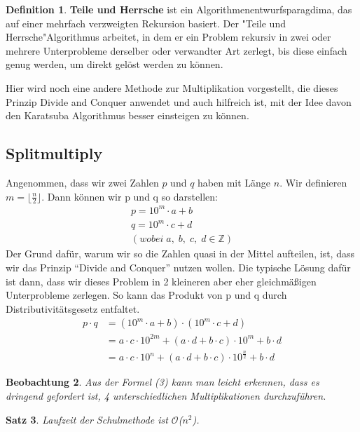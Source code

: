 \documentclass[11pt,a4paper, twoside]{article}
\newtheorem{theorem}{Satz}
\newtheorem{observation}[theorem]{Beobachtung}
\theoremstyle{definition}
\newtheorem{definition}[theorem]{Definition}
\begin{document}
\begin{definition}
\textbf{Teile und Herrsche} ist ein Algorithmenentwurfsparagdima, das auf einer mehrfach verzweigten Rekursion basiert. Der "Teile und Herrsche"\-Algorithmus arbeitet, in dem er ein Problem rekursiv in zwei oder mehrere Unterprobleme derselber oder verwandter Art zerlegt, bis diese einfach genug werden, um direkt gelöst werden zu können. 
\end{definition}

Hier wird noch eine andere Methode zur Multiplikation vorgestellt, die dieses Prinzip Divide and Conquer anwendet und auch hilfreich ist, mit der Idee davon den Karatsuba Algorithmus besser einsteigen zu können. \\

\subsection{Splitmultiply}
Angenommen, dass wir zwei Zahlen $p$ und $q$ haben mit Länge $n$. Wir definieren $m = \lfloor \frac{n}{2} \rfloor$. Dann können wir p und q so darstellen: 
\begin{align*}
p = 10^{m} \cdot a + b\\
q = 10^{m} \cdot c + d\\
(wobei \;a, \;b, \;c, \;d \in \mathbb{Z})
\end{align*}
 Der Grund dafür, warum wir so die Zahlen quasi in der Mittel aufteilen, ist, dass wir das Prinzip “Divide and Conquer” nutzen wollen. Die typische Lösung dafür ist dann, dass wir dieses Problem in 2 kleineren aber eher gleichmäßigen Unterprobleme zerlegen.
So kann das Produkt von p und q durch Distributivitätsgesetz entfaltet.
\begin{align}
p \cdot q &= (10^{m} \cdot a + b) \cdot (10^{m} \cdot c + d)\\
&= a \cdot c \cdot 10^{2m} + (a \cdot d + b \cdot c) \cdot 10^{m} + b \cdot d\\
&= a \cdot c \cdot 10^{n} + (a \cdot d + b \cdot c) \cdot 10^{\frac{n}{2}} + b \cdot d
\end{align}

\begin{observation}
Aus der Formel (3) kann man leicht erkennen, dass es dringend gefordert ist, 4 unterschiedlichen Multiplikationen durchzuführen.
\end{observation}

\begin{theorem}
Laufzeit der Schulmethode ist $\mathcal{O}$($n^{2}$).
\end{theorem}
\end{document}
